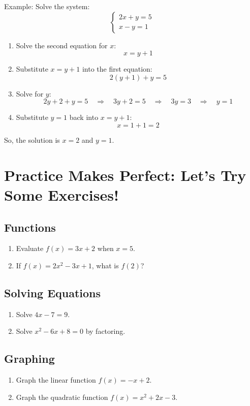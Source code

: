 Example: Solve the system:
\[
\begin{cases}
2x + y = 5 \\
x - y = 1
\end{cases}
\]
\begin{enumerate}
    \item Solve the second equation for \( x \):
    \[ x = y + 1 \]
    \item Substitute \( x = y + 1 \) into the first equation:
    \[ 2(y + 1) + y = 5 \]
    \item Solve for \( y \):
    \[ 2y + 2 + y = 5 \quad \Rightarrow \quad 3y + 2 = 5 \quad \Rightarrow \quad 3y = 3 \quad \Rightarrow \quad y = 1 \]
    \item Substitute \( y = 1 \) back into \( x = y + 1 \):
    \[ x = 1 + 1 = 2 \]
\end{enumerate}
So, the solution is \( x = 2 \) and \( y = 1 \).

\section{Practice Makes Perfect: Let’s Try Some Exercises!}
\subsection*{Functions}
\begin{enumerate}
    \item Evaluate \( f(x) = 3x + 2 \) when \( x = 5 \).
    \item If \( f(x) = 2x^2 - 3x + 1 \), what is \( f(2) \)?
\end{enumerate}

\subsection*{Solving Equations}
\begin{enumerate}
    \item Solve \( 4x - 7 = 9 \).
    \item Solve \( x^2 - 6x + 8 = 0 \) by factoring.
\end{enumerate}

\subsection*{Graphing}
\begin{enumerate}
    \item Graph the linear function \( f(x) = -x + 2 \).
    \item Graph the quadratic function \( f(x) = x^2 + 2x - 3 \).
\end{enumerate}

